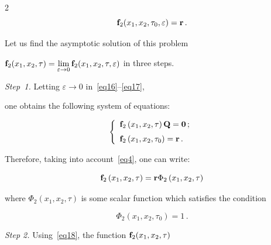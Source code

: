 \begin{multicols}{2}
\begin{equation}
\label{eq17}


{\bf f}_2(x_1,x_2,\tau_0,\varepsilon)={\bf r}\,.


\end{equation}





Let us find the asymptotic solution of this problem 


${\bf f}_2(x_1,x_2,\tau)=


\lim\limits_{\varepsilon\to 0}{\bf f}_2(x_1,x_2,\tau,\varepsilon)$ in three steps.





\textit{Step~1.} Letting $\varepsilon\to 0$ in~\eqref{eq16}--\eqref{eq17}, 


one obtains the following system of equations:


$$


\left\{


\begin{array}{l}


{\bf f}_2\left(x_1,x_2,\tau\right)\mathbf{Q}=\mathbf{0}\,; \\[6pt]


{\bf f}_2\left(x_1,x_2,\tau_0\right)={\bf r}\,.


\end{array}


\right.


$$


Therefore, taking into account~\eqref{eq4}, one can write:


\begin{equation}


\label{eq18}


{\bf f}_2\left(x_1,x_2,\tau\right)={\bf r}\Phi_2\left(x_1,x_2,\tau\right)


\end{equation}


where $\Phi_2(x_1,x_2,\tau)$  is some scalar function which satisfies the condition


\begin{equation}


\label{eq19}


\Phi_2\left(x_1,x_2,\tau_0\right)=1\,.


\end{equation}





\textit{Step 2.} Using~\eqref{eq18}, the function ${\bf f}_2(x_1,x_2,\tau)$  



\end{multicols}
